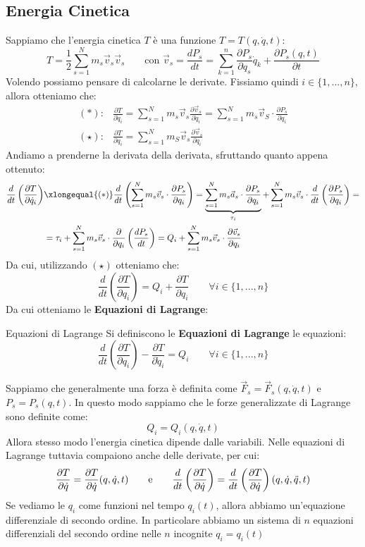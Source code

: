 \documentclass[11pt,a4paper,twoside]{article}
\theoremstyle{definition}
\begin{document}
\subsection{Energia Cinetica}

Sappiamo che l'energia cinetica $T$ è una funzione $T = T(q, \dot q, t)$:
\[ T = \frac 12 \sum_{s=1}^N m_s \vec v_s \vec v_s \qquad \text{con }\vec v_s = \frac{dP_s}{dt} = \sum_{k=1}^n \frac{\partial P_s}{\partial q_s}\dot q_k + \frac{\partial P_s(q,t)}{\partial t} \]
Volendo possiamo pensare di calcolarne le derivate. Fissiamo quindi $i \in \{1,...,n\}$, allora otteniamo che:
\begin{align*}
	(*): & \frac{\partial T}{\partial \dot q_i} = \sum_{s=1}^N m_s \vec v_s \frac{\partial \vec v_s}{\partial \dot q_i} = \sum_{s=1}^N m_s \vec v_S \cdot \frac{\partial P_s}{\partial q_i}\\
	(\star): & \frac{\partial T}{\partial q_i} = \sum_{s=1}^N m_S \vec v_s \frac{\partial \vec v_s}{\partial q_i}
\end{align*}
Andiamo a prenderne la derivata della derivata, sfruttando quanto appena ottenuto:
\begin{align*}
	\frac d{dt} \left( \frac{\partial T}{\partial \dot q_i} \right) &\xlongequal{(*)} \frac {d}{dt} \left( \sum_{s=1}^N m_s \vec v_s \cdot \frac{\partial P_s}{\partial q_i} \right) = \underbrace{\sum_{s=1}^N m_s \vec a_s \cdot \frac{\partial P_s}{\partial q_i}}_{\tau_i} + \sum_{s=1}^N m_s \vec v_s \cdot \frac{d}{dt} \left( \frac{\partial P_s}{\partial q_i} \right) =\\
	&= \tau_i + \sum_{s=1}^N m_s \vec v_s \cdot \frac{\partial}{\partial q_i}\left( \frac{dP_s}{dt} \right) = Q_i + \sum_{s=1}^N m_s \vec v_s \cdot \frac{\partial \vec v_s}{\partial q_i}
\end{align*}
Da cui, utilizzando $(\star)$ otteniamo che:
\[ \frac{d}{dt} \left(\frac{\partial T}{\partial q_i}\right) = Q_i + \frac{\partial T}{\partial q_i} \qquad \forall i \in\{1,...,n\} \]
Da cui otteniamo le \textbf{Equazioni di Lagrange}:

\begin{defn}{Equazioni di Lagrange}{}
	Si definiscono le \textbf{Equazioni di Lagrange} le equazioni:
	\[ \frac d{dt}\left(\frac {\partial T}{\partial q_i}\right) - \frac{\partial T}{\partial \dot q_i} = Q_i \qquad \forall i \in \{1,...,n\} \]
\end{defn}

Sappiamo che generalmente una forza è definita come $\vec F_s = \vec F_s(q, \dot q, t)$ e $P_s = P_s(q,t)$. In questo modo sappiamo che le forze generalizzate di Lagrange sono definite come:
\[ Q_i = Q_i(q,\dot q, t) \]
Allora stesso modo l'energia cinetica dipende dalle variabili. Nelle equazioni di Lagrange tuttavia compaiono anche delle derivate, per cui:
\[ \frac{\partial T}{\partial \dot q} =\frac{\partial T}{\partial \dot q}(q, \dot q, t) \qquad \text e \qquad \frac{d}{dt}\left(\frac{\partial T}{\partial \dot q}\right) = \frac{d}{dt}\left(\frac{\partial T}{\partial \dot q}\right)(q,\dot q, \ddot q, t) \]
Se vediamo le $q_i$ come funzioni nel tempo $q_i(t)$, allora abbiamo un'equazione differenziale di secondo ordine. In particolare abbiamo un sistema di $n$ equazioni differenziali del secondo ordine nelle $n$ incognite $q_i = q_i(t)$
\end{document}
